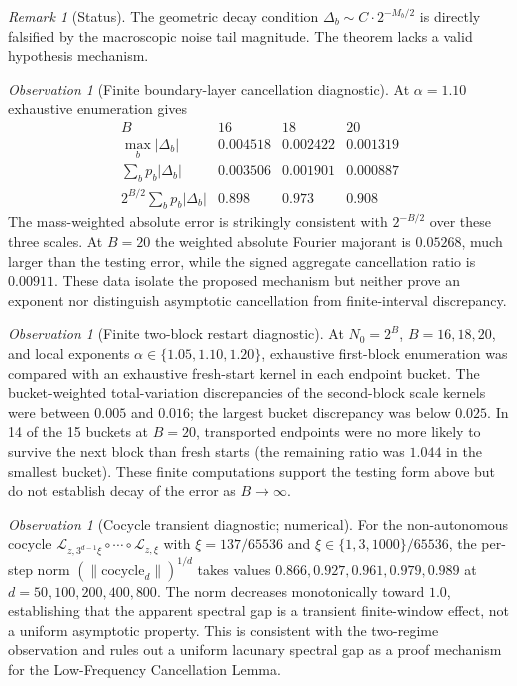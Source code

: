 \documentclass[12pt,a4paper]{article}
\theoremstyle{remark}
\newtheorem{remark}[theorem]{Remark}
\newtheorem{observation}[theorem]{Observation}
\begin{document}
\begin{remark}[Status]
The geometric decay condition $\Delta_b \sim C \cdot 2^{-M_b/2}$ is directly falsified by the macroscopic noise tail magnitude. The theorem lacks a valid hypothesis mechanism.
\end{remark}
\begin{observation}[Finite boundary-layer cancellation diagnostic]
At $\alpha=1.10$ exhaustive enumeration gives
\[
\begin{array}{c|ccc}
B&16&18&20\\ \hline
\max_b|\Delta_b|&0.004518&0.002422&0.001319\\
\sum_bp_b|\Delta_b|&0.003506&0.001901&0.000887\\
2^{B/2}\sum_bp_b|\Delta_b|&0.898&0.973&0.908
\end{array}
\]
The mass-weighted absolute error is strikingly consistent with
$2^{-B/2}$ over these three scales.  At $B=20$ the weighted absolute Fourier
majorant is $0.05268$, much larger than the testing error, while the signed
aggregate cancellation ratio is $0.00911$.  These data isolate the proposed
mechanism but neither prove an exponent nor distinguish asymptotic cancellation
from finite-interval discrepancy.
\end{observation}
\begin{observation}[Finite two-block restart diagnostic]
At $N_0=2^B$, $B=16,18,20$, and local exponents
$\alpha\in\{1.05,1.10,1.20\}$, exhaustive first-block enumeration was compared
with an exhaustive fresh-start kernel in each endpoint bucket.  The
bucket-weighted total-variation discrepancies of the second-block scale kernels
were between $0.005$ and $0.016$; the largest bucket discrepancy was below
$0.025$.  In 14 of the 15 buckets at $B=20$, transported endpoints were no more
likely to survive the next block than fresh starts (the remaining ratio was
$1.044$ in the smallest bucket).  These finite computations support the testing
form above but do not establish decay of the error as $B\to\infty$.
\end{observation}
\begin{observation}[Cocycle transient diagnostic; numerical]
For the non-autonomous cocycle $\mathcal{L}_{z,3^{d-1}\xi}\circ\cdots\circ\mathcal{L}_{z,\xi}$
with $\xi = 137/65536$ and $\xi \in \{1,3,1000\}/65536$, the per-step norm
$(\|\text{cocycle}_d\|)^{1/d}$ takes values $0.866, 0.927, 0.961, 0.979, 0.989$
at $d = 50, 100, 200, 400, 800$. The norm decreases monotonically toward $1.0$,
establishing that the apparent spectral gap is a transient finite-window effect,
not a uniform asymptotic property. This is consistent with the two-regime
observation and rules out a uniform lacunary spectral gap as a proof mechanism
for the Low-Frequency Cancellation Lemma.
\end{observation}
\end{document}
